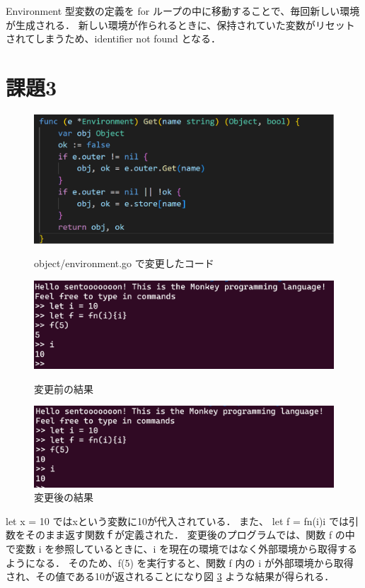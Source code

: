 \documentclass[fleqn, a4paper. 12pt]{ltjsarticle}
\begin{document}
Environment 型変数の定義を for ループの中に移動することで、毎回新しい環境が生成される．
新しい環境が作られるときに、保持されていた変数がリセットされてしまうため、identifier not found となる．
\newpage

\section{課題3}
\begin{figure}[h]
    \centering
    \includegraphics[width=0.5\linewidth]{images/2/3_env.png}
    \label{fig:env_3}
    \caption{object/environment.go で変更したコード}
\end{figure}
\begin{figure}[h]
    \centering
    \includegraphics[width=0.5\linewidth]{images/2/3_before.png}
    \label{fig:3_before}
    \caption{変更前の結果}
\end{figure}
\begin{figure}[h]
    \centering
    \includegraphics[width=0.5\linewidth]{images/2/3_after.png}
    \caption{変更後の結果}
    \label{fig:3_after}
\end{figure}

let x = 10 ではxという変数に10が代入されている．
また、 let f = fn(i){i} では引数をそのまま返す関数ｆが定義された．
変更後のプログラムでは、関数 f の中で変数 i を参照しているときに、i を現在の環境ではなく外部環境から取得するようになる．
そのため、f(5) を実行すると、関数 f 内の i が外部環境から取得され、その値である10が返されることになり図 \ref{fig:3_after} ような結果が得られる．
\end{document}
